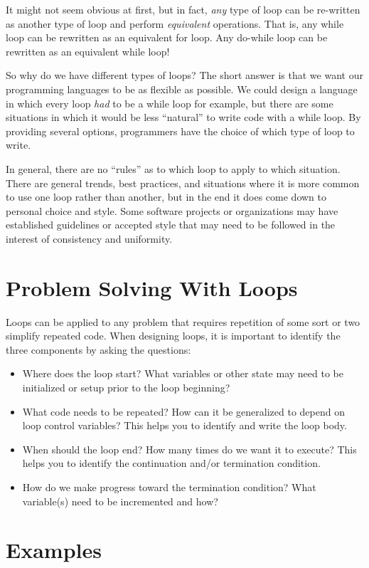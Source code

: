 It might not seem obvious at first, but in fact, \emph{any} type of loop can be re-written 
as another type of loop and perform \emph{equivalent} operations.  That is, any while loop
can be rewritten as an equivalent for loop.  Any do-while loop can be rewritten as an 
equivalent while loop!  

So why do we have different types of loops?  The short answer is that we want our programming
languages to be as flexible as possible.  We could design a language in which every loop
\emph{had} to be a while loop for example, but there are some situations in which it would be 
less ``natural'' to write code with a while loop.  By providing several options, programmers have
the choice of which type of loop to write.  

In general, there are no ``rules'' as to which loop to apply to which situation.  There are general
trends, best practices, and situations where it is more common to use one loop rather than another,
but in the end it does come down to personal choice and style.  Some software projects or
organizations may have established guidelines or accepted style that may need to be followed
in the interest of consistency and uniformity.  

\section{Problem Solving With Loops}

Loops can be applied to any problem that requires repetition of some sort or two simplify
repeated code.  When designing loops, it is important to identify the three components by asking
the questions:
\begin{itemize}
  \item Where does the loop start?  What variables or other state may need to be initialized or setup
  	prior to the loop beginning?
  \item What code needs to be repeated?  How can it be generalized to depend on loop control variables?
  	This helps you to identify and write the loop body.
  \item When should the loop end?  How many times do we want it to execute?  This helps you to 
  	identify the continuation and/or termination condition.
  \item How do we make progress toward the termination condition?  What variable(s) need to be incremented
  	and how?
\end{itemize}

\section{Examples}

